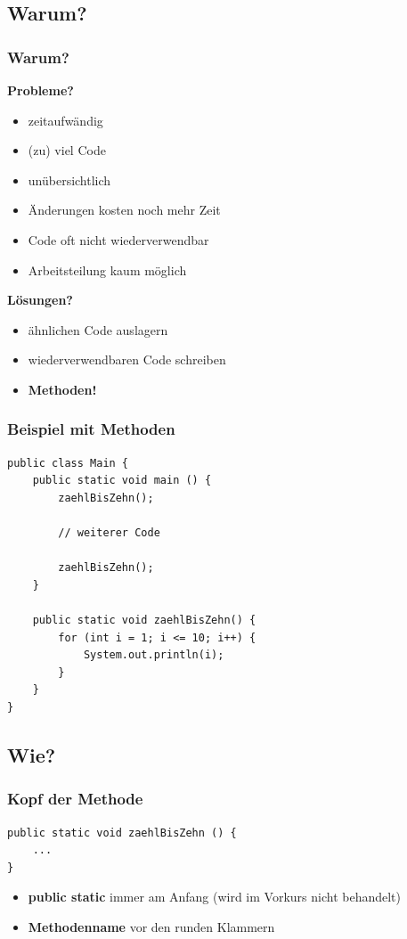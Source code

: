 \documentclass[final]{beamer}
\begin{document}
\subsection{Warum?}
\begin{frame}
	\frametitle{Warum?}
	\textbf{Probleme?}
	\begin{itemize}
		\item{zeitaufwändig}
		\item{(zu) viel Code}
		\item{unübersichtlich}
		\item{Änderungen kosten noch mehr Zeit}
		\item{Code oft nicht wiederverwendbar}
		\item{Arbeitsteilung kaum möglich}
	\end{itemize}
	\pause
	\vspace{\baselineskip}
	\textbf{Lösungen?}
	\pause
	\begin{itemize}
		\item{ähnlichen Code auslagern}
		\item{wiederverwendbaren Code schreiben}
		\item{\textbf{Methoden!}}
	\end{itemize}
\end{frame}

\begin{frame}[containsverbatim]
	\frametitle{Beispiel mit Methoden}
	\begin{lstlisting}
public class Main {
	public static void main () {
		zaehlBisZehn();
		
		// weiterer Code
		
		zaehlBisZehn();
	}
	
	public static void zaehlBisZehn() {
		for (int i = 1; i <= 10; i++) {
			System.out.println(i);
		}
	}
}
	\end{lstlisting}
\end{frame}

\subsection{Wie?}
\begin{frame}[containsverbatim]
	\frametitle{Kopf der Methode}
	\begin{lstlisting}
public static void zaehlBisZehn () { 
	...
}
	\end{lstlisting}
	\begin{itemize}
		\item{\textbf{public static} immer am Anfang (wird im Vorkurs nicht behandelt)}
		\item{\textbf{Methodenname} vor den runden Klammern}
	\end{itemize}
\end{frame}
\end{document}
